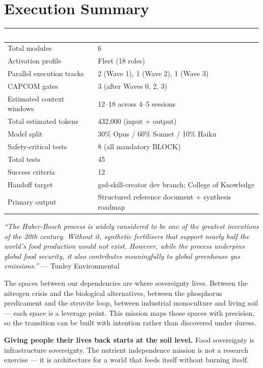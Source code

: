 \documentclass[11pt,letterpaper]{article}
\newcommand{\tableheader}[1]{\textbf{\sffamily\textcolor{white}{#1}}}
\begin{document}
\section{Execution Summary}

\begin{center}
\begin{tabularx}{\textwidth}{L{4cm}X}
\toprule
{}
\tableheader{Metric} & \tableheader{Value} \\
\midrule
Total modules & 6 \\
Activation profile & Fleet (18 roles) \\
Parallel execution tracks & 2 (Wave 1), 1 (Wave 2), 1 (Wave 3) \\
CAPCOM gates & 3 (after Waves 0, 2, 3) \\
Estimated context windows & 12--18 across 4--5 sessions \\
Total estimated tokens & 432,000 (input + output) \\
Model split & 30\% Opus / 60\% Sonnet / 10\% Haiku \\
Safety-critical tests & 8 (all mandatory BLOCK) \\
Total tests & 45 \\
Success criteria & 12 \\
Handoff target & gsd-skill-creator dev branch; College of Knowledge \\
Primary output & Structured reference document + synthesis roadmap \\
\bottomrule
\end{tabularx}
\end{center}

\vspace{2em}

\begin{quotebox}
\textit{``The Haber-Bosch process is widely considered to be one of the greatest inventions of the 20th century. Without it, synthetic fertilisers that support nearly half the world's food production would not exist. However, while the process underpins global food security, it also contributes meaningfully to global greenhouse gas emissions.''} --- Tunley Environmental

\vspace{1em}

The spaces between our dependencies are where sovereignty lives. Between the nitrogen crisis and the biological alternatives, between the phosphorus predicament and the struvite loop, between industrial monoculture and living soil --- each space is a leverage point. This mission maps those spaces with precision, so the transition can be built with intention rather than discovered under duress.

\vspace{1em}

\textbf{Giving people their lives back starts at the soil level.} Food sovereignty is infrastructure sovereignty. The nutrient independence mission is not a research exercise --- it is architecture for a world that feeds itself without burning itself.
\end{quotebox}
\end{document}

